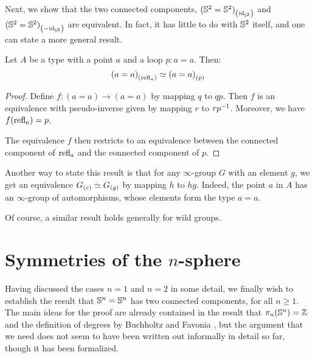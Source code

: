 \documentclass[english,a4paper]{lmcs}
\begin{document}
Next, we show that the two connected components,
${({{\mathbb S^{2}}} = {{\mathbb S^{2}}})}_{\left(\mathord{\mathrm{id}}_{{\mathbb S^{2}}}\right)}$ and
${({{\mathbb S^{2}}} = {{\mathbb S^{2}}})}_{\left(-\mathord{\mathrm{id}}_{{\mathbb S^{2}}}\right)}$ are equivalent.
In fact, it has little to do with ${{\mathbb S^{2}}}$ itself, and one can state a more
general result.
\begin{prop} \label{prop:equiv-susp-comp}
  Let $A$ be a type with a point $a$ and a loop $p : a = a$. Then:
  \begin{displaymath}
    {(a = a)}_{\left(\mathop{{\mathrm{refl}}_{a}}\right)} \simeq {(a = a)}_{\left(p\right)}
  \end{displaymath}
\end{prop}
\begin{proof}
  Define $f:{(a = a)} \to (a = a)$ by mapping
  $q$ to $qp$.
  Then $f$ is an equivalence with pseudo-inverse given by mapping $r$ to $rp^{-1}$.
  Moreover, we have $f(\mathop{{\mathrm{refl}}_{a}}) = p$.

  The equivalence $f$ then restricts to an equivalence between the connected
  component of $\mathop{{\mathrm{refl}}_{a}}$ and the connected component of $p$.
\end{proof}
\begin{rem}
  Another way to state this result is that for any $\infty$-group $G$
  with an element $g$, we get an equivalence ${G}_{\left(e\right)} \simeq {G}_{\left(g\right)}$
  by mapping $h$ to $hg$.
  Indeed, the point $a$ in $A$ has an $\infty$-group of automorphisms,
  whose elements form the type $a=a$.

  Of course, a similar result holds generally for wild groups.
\end{rem}

\section{Symmetries of the \texorpdfstring{$n$}{n}-sphere}
\label{sec:higher-sphere}



Having discussed the cases $n = 1$ and $n = 2$ in some detail, we finally wish to establish the result that ${\mathbb S^{n}} = {\mathbb S^{n}}$ has two connected components, for all $n \geq 1$.
The main ideas for the proof are already contained in the result that $\pi_n({\mathbb S^{n}}) = \mathbb{Z}$ \cite{licataBrunerie_s1again} and the definition of degrees by Buchholtz and Favonia \cite{Buchholtz2018CellularCI}, but the argument that we need does not seem to have been written out
informally in detail so far, though it has been formalized.
\end{document}
